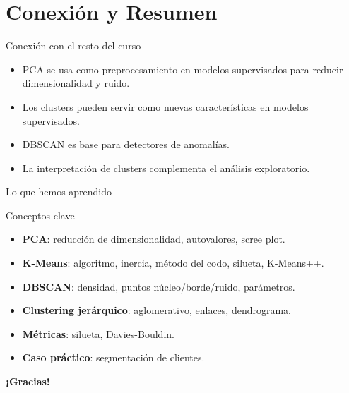 \documentclass[aspectratio=169, 10pt, xcolor=table]{beamer}
\begin{document}
\section{Conexión y Resumen}

\begin{frame}{Conexión con el resto del curso}
    \begin{itemize}
        \item PCA se usa como preprocesamiento en modelos supervisados para reducir dimensionalidad y ruido.
        \item Los clusters pueden servir como nuevas características en modelos supervisados.
        \item DBSCAN es base para detectores de anomalías.
        \item La interpretación de clusters complementa el análisis exploratorio.
    \end{itemize}
\end{frame}

\begin{frame}{Lo que hemos aprendido}
    \begin{exampleblock}{Conceptos clave}
        \begin{itemize}
            \item \textbf{PCA}: reducción de dimensionalidad, autovalores, scree plot.
            \item \textbf{K-Means}: algoritmo, inercia, método del codo, silueta, K-Means++.
            \item \textbf{DBSCAN}: densidad, puntos núcleo/borde/ruido, parámetros.
            \item \textbf{Clustering jerárquico}: aglomerativo, enlaces, dendrograma.
            \item \textbf{Métricas}: silueta, Davies-Bouldin.
            \item \textbf{Caso práctico}: segmentación de clientes.
        \end{itemize}
    \end{exampleblock}
\end{frame}

\begin{frame}
    \centering
    \Huge \textbf{¡Gracias!}

\end{frame}
\end{document}
